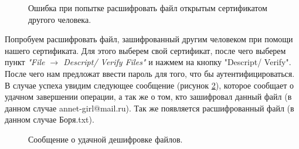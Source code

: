 \documentclass[10pt,a4paper]{report}
\begin{document}
\begin{figure}[h]
	\caption{Ошибка при попытке расшифровать файл открытым сертификатом другого человека.}
	\label{ris:step46}
\end{figure}

Попробуем расшифровать файл, зашифрованный другим человеком при помощи нашего сертификата. Для этого выберем свой сертификат, после чего выберем пункт \textit{"File \begin{math}\to\end{math} Descript/ Verify Files"} и нажмем на кнопку "Descript/ Verify". После чего нам предложат ввести пароль для того, что бы аутентифицироваться. В случае успеха увидим следующее сообщение (рисунок \ref{ris:step47}), которое сообщает о удачном завершении операции, а так же о том, кто зашифровал данный файл (в данном случае annet-girl@mail.ru). Так же появляется расшифрованный файл (в данном случае Боря.txt).

\begin{figure}[h]
	\caption{Сообщение о удачной дешифровке файлов.}
	\label{ris:step47}
\end{figure}
\end{document}
